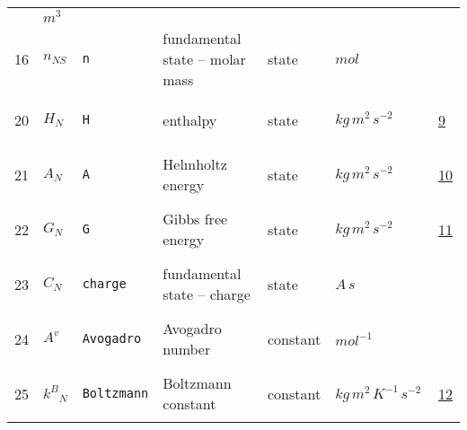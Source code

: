 \begin{longtable}{|p{1cm}|p{2.5cm}|p{4.5cm}|p{8cm}|p{3.0cm}|p{3cm}|p{1cm}|}
             & $ m^{3} \, $
             & \\
    16
             & \hypertarget{"v:16"}{ $ {n}{_{{N S}}} $}
             & \verb|n|
             & fundamental state -- molar mass
             & \begin{lay}state \end{lay}
             & $ mol \, $
             & \\
    20
             & \hypertarget{"v:20"}{ $ {H}{_{N}} $}
             & \verb|H|
             & enthalpy
             & \begin{lay}state \end{lay}
             & $ kg \,m^{2} \,s^{-2} \, $
             & \hyperlink{"e:9"}{ 9 }
                 \\
    21
             & \hypertarget{"v:21"}{ $ {A}{_{N}} $}
             & \verb|A|
             & Helmholtz energy
             & \begin{lay}state \end{lay}
             & $ kg \,m^{2} \,s^{-2} \, $
             & \hyperlink{"e:10"}{ 10 }
                 \\
    22
             & \hypertarget{"v:22"}{ $ {G}{_{N}} $}
             & \verb|G|
             & Gibbs free energy
             & \begin{lay}state \end{lay}
             & $ kg \,m^{2} \,s^{-2} \, $
             & \hyperlink{"e:11"}{ 11 }
                 \\
    23
             & \hypertarget{"v:23"}{ $ {C}{_{N}} $}
             & \verb|charge|
             & fundamental state -- charge
             & \begin{lay}state \end{lay}
             & $ A \,s \, $
             & \\
    24
             & \hypertarget{"v:24"}{ $ {{A^v}}{_{}} $}
             & \verb|Avogadro|
             & Avogadro number
             & \begin{lay}constant \end{lay}
             & $ mol^{-1} \, $
             & \\
    25
             & \hypertarget{"v:25"}{ $ {{k^B}}{_{N}} $}
             & \verb|Boltzmann|
             & Boltzmann constant
             & \begin{lay}constant \end{lay}
             & $ kg \,m^{2} \,K^{-1} \,s^{-2} \, $
             & \hyperlink{"e:12"}{ 12 }
                 \\

\end{longtable}
